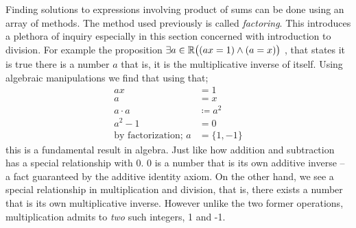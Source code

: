 \documentclass{article}
\newcommand{\paren}[1]{\mathopen{}\left( {#1}_{{}_{}}\,\negthickspace\right)\mathclose{}} %
\begin{document}
Finding solutions to expressions involving product of sums can be done using an array of methods. The method
used previously is called \emph{factoring}. This introduces a plethora of inquiry especially in this section
concerned with introduction to division. For example the proposition \(\exists a \in \mathbb{R} \paren{(ax = 1) \land (a = x)}\)
, that states it is true there is a number \(a\) that is, it is the multiplicative inverse of itself. Using algebraic 
manipulations we find that using that;
\begin{align*}
    ax &= 1 \\
    a &= x \\
    a \cdot a &\coloneqq a^2 \\
    a^2 - 1 &= 0 \\ 
    \text{by factorization; } a &= \{1, -1\} 
\end{align*}
this is a fundamental result in algebra. Just like how addition and subtraction has a special relationship
with 0. 0 is a number that is its own additive inverse -- a fact guaranteed by the additive identity axiom. 
On the other hand, we see a special relationship in multiplication and division, that is,
there exists a number that is its own multiplicative inverse. However unlike the two former operations,
multiplication admits to \emph{two} such integers, 1 and -1.  
\end{document}
